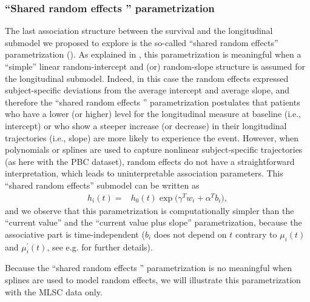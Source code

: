 \documentclass[12pt]{article}
\begin{document}
\subsubsection{``Shared random effects '' parametrization}
\label{SRE}
The last association structure between the survival and the longitudinal submodel we proposed to explore is the so-called ``shared random effects'' parametrization (\cite{Wulfsohn1997}). As explained in \cite{Rizopoulos_JASA}, this parametrization is meaningful when a ``simple'' linear random-intercept and (or) random-slope structure is assumed for the longitudinal submodel. Indeed, in this case the random effects expressed subject-specific deviations from the average intercept and average slope, and therefore the ``shared random effects '' parametrization postulates that patients who have a lower (or higher) level for the longitudinal measure at baseline (i.e., intercept) or who show a steeper increase (or decrease) in their longitudinal trajectories (i.e., slope) are more likely to experience the event. However, when polynomials or splines are used to capture nonlinear subject-specific trajectories (as here with the PBC dataset), random effects do not have a straightforward interpretation, which leads to uninterpretable association parameters.
This ``shared random effects'' submodel can be written as
\begin{equation}
\begin{split}
h_i(t) = &h_0 (t) \exp \big(\gamma^T w_i +\alpha^{T}b_i\big),
\end{split}
\label{SRE_1}
\end{equation}
and we observe that this parametrization is computationally simpler than the ``current value'' and the ``current value plus slope'' parametrization, because the associative part is time-independent ($b_i$ does not depend on $t$ contrary to $\mu_i(t)$ and $\mu_i^{'}(t)$, see e.g. \cite{Rizopoulos_JASA} for further details).

Because the ``shared random effects '' parametrization is no meaningful when splines are used to model random effects, we will illustrate this parametrization with the MLSC data only.
\end{document}
